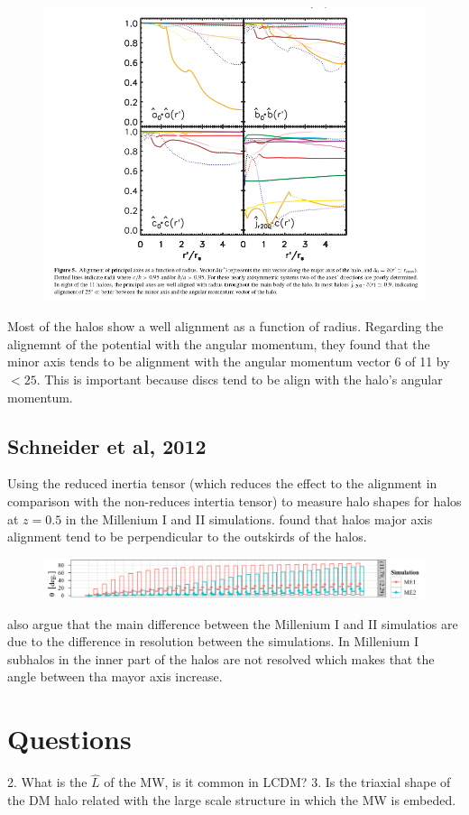 \begin{figure}
\includegraphics[scale=0.5]{alignmentH.png}
\end{figure}		

Most of the halos show a well alignment as a function of radius. 
Regarding the alignemnt of the potential with the angular momentum, they 
found that the minor axis tends to be alignment with the angular 
momentum vector 6 of 11 by $<25$. This is important because discs tend 
to be align with the halo's angular momentum. 

\subsection{Schneider et al, 2012}

Using the reduced inertia tensor (which reduces the effect to the alignment
in comparison with the non-reduces intertia tensor) to measure halo 
shapes for halos
at $z=0.5$ in the Millenium I and II simulations. \citep{scheider12}
found that halos major axis alignment tend to be perpendicular to the outskirds
of the halos.  

\begin{figure}[H]
\includegraphics[scale=0.5]{schneideralignments.png}
\end{figure}

\citep{schneider12} also argue that the main difference between the 
Millenium I and II simulatios are due to the difference in resolution 
between the simulations. In Millenium I subhalos in the inner part 
of the halos are not resolved which makes that the angle between 
tha mayor axis increase. 

\section{Questions}

2. What is the $\hat{L}$ of the MW, is it common in LCDM?
3. Is the triaxial shape of the DM halo related with the large
scale structure in which the MW is embeded.





